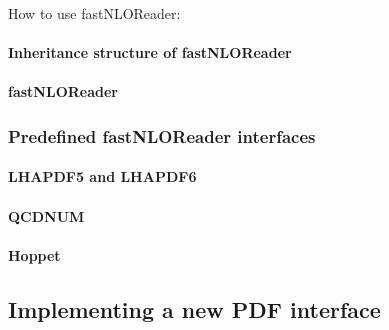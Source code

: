 \documentclass[a4paper,11pt]{article}
\begin{document}
How to use fastNLOReader:
%










\paragraph{Inheritance structure of fastNLOReader}
\paragraph{fastNLOReader}
\subsubsection{Predefined fastNLOReader interfaces}
\paragraph{LHAPDF5 and LHAPDF6}
\paragraph{QCDNUM}
\paragraph{Hoppet}
\subsection{Implementing a new PDF interface}
\end{document}
